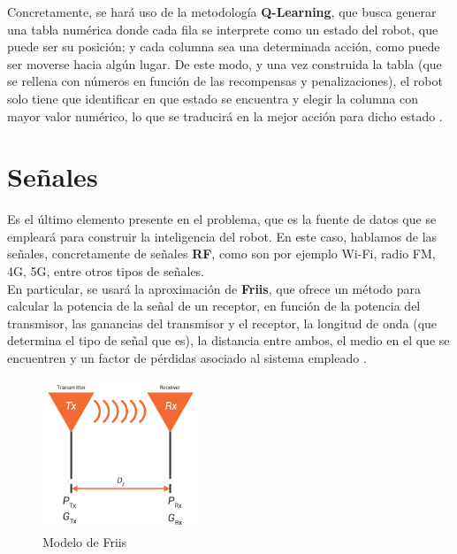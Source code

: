 Concretamente, se hará uso de la metodología \textbf{Q-Learning}, que busca generar una tabla numérica donde cada fila se interprete como un estado del robot, que puede ser su posición; y cada columna sea una determinada acción, como puede ser moverse hacia algún lugar. De este modo, y una vez construida la tabla (que se rellena con números en función de las recompensas y penalizaciones), el robot solo tiene que identificar en que estado se encuentra y elegir la columna con mayor valor numérico, lo que se traducirá en la mejor acción para dicho estado \cite{q-learning}.

\newpage
\section{Señales}
\label{subsec:señales}

Es el último elemento presente en el problema, que es la fuente de datos que se empleará para construir la inteligencia del robot. En este caso, hablamos de las señales, concretamente de señales \textbf{\ac{RF}}, como son por ejemplo Wi-Fi, radio FM, 4G, 5G, entre otros tipos de señales.\\

En particular, se usará la aproximación de \textbf{Friis}, que ofrece un método para calcular la potencia de la señal de un receptor, en función de la potencia del transmisor, las ganancias del transmisor y el receptor, la longitud de onda (que determina el tipo de señal que es), la distancia entre ambos, el medio en el que se encuentren y un factor de pérdidas asociado al sistema empleado \cite{friis-1} \cite{friis-2} \cite{friis-3}.\\

\begin{figure} [H]
	\begin{center}
	\includegraphics[height=4.5cm]{imagenes/cap1/10_friis.png}
	\end{center}
	\caption[Modelo de Friis]{Modelo de Friis}
	\label{fig:friis}
\end{figure}

